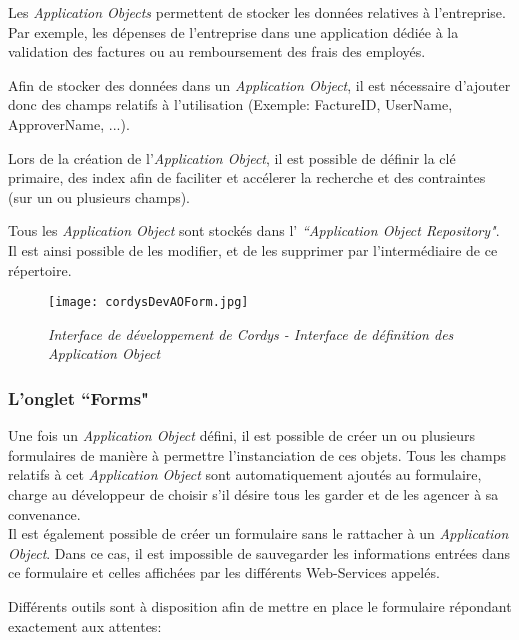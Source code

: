 Les \emph{Application Objects} permettent de stocker les données relatives à l'entreprise. Par exemple, les dépenses de l'entreprise dans une application dédiée à la validation des factures ou au remboursement des frais des employés.

Afin de stocker des données dans un \emph{Application Object}, il est nécessaire d'ajouter donc des champs relatifs à l'utilisation (Exemple: FactureID, UserName, ApproverName, ...).

Lors de la création de l'\emph{Application Object}, il est possible de définir la clé primaire, des index afin de faciliter et accélerer la recherche et des contraintes (sur un ou plusieurs champs).

Tous les \emph{Application Object} sont stockés dans l' \emph{``Application Object Repository"}. Il est ainsi possible de les modifier, et de les supprimer par l'intermédiaire de ce répertoire.

 \begin{figure}[H]
    \centering
    \texttt{[image: cordysDevAOForm.jpg]}
	\caption{\textit{Interface de développement de Cordys - Interface de définition des Application Object}}\label{image.CordysDevAOForm} 
\end{figure}

\clearpage

\subsubsection{L'onglet ``Forms"}

Une fois un \emph{Application Object} défini, il est possible de créer un ou plusieurs formulaires de manière à permettre l'instanciation de ces objets. Tous les champs relatifs à cet \emph{Application Object} sont automatiquement ajoutés au formulaire, charge au développeur de choisir s'il désire tous les garder et de les agencer à sa convenance.\\
Il est également possible de créer un formulaire sans le rattacher à un \emph{Application Object}. Dans ce cas, il est impossible de sauvegarder les informations entrées dans ce formulaire et celles affichées par les différents Web-Services appelés.

Différents outils sont à disposition afin de mettre en place le formulaire répondant exactement aux attentes: 

